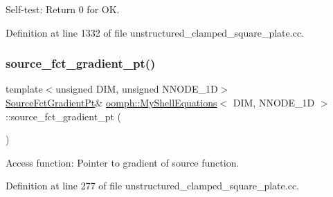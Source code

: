Self-\/test\+: Return 0 for OK. 



Definition at line 1332 of file unstructured\+\_\+clamped\+\_\+square\+\_\+plate.\+cc.

\mbox{\label{classoomph_1_1MyShellEquations_a1ade98830b556492e11aef07cf34d3ed}} 
\subsubsection{\texorpdfstring{source\+\_\+fct\+\_\+gradient\+\_\+pt()}{source\_fct\_gradient\_pt()}\hspace{0.1cm}{\footnotesize\ttfamily [1/2]}}
{\footnotesize\ttfamily template$<$unsigned D\+IM, unsigned N\+N\+O\+D\+E\+\_\+1D$>$ \\
\hyperlink{classoomph_1_1MyShellEquations_a954dcc1b78710f331ed390b716aa07dd}{Source\+Fct\+Gradient\+Pt}\& \hyperlink{classoomph_1_1MyShellEquations}{oomph\+::\+My\+Shell\+Equations}$<$ D\+IM, N\+N\+O\+D\+E\+\_\+1D $>$\+::source\+\_\+fct\+\_\+gradient\+\_\+pt (\begin{DoxyParamCaption}{ }\end{DoxyParamCaption})\hspace{0.3cm}{\ttfamily [inline]}}



Access function\+: Pointer to gradient of source function. 



Definition at line 277 of file unstructured\+\_\+clamped\+\_\+square\+\_\+plate.\+cc.

\mbox{\label{classoomph_1_1MyShellEquations_aeb57d576c45c382206c6af6b8b06b575}} 
